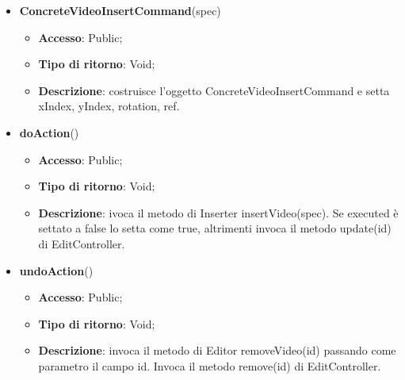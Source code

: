 {{{	
	\begin{itemize}
		\item \textbf{ConcreteVideoInsertCommand}(spec)
		\begin{itemize}
			\item \textbf{Accesso}: Public;
			\item \textbf{Tipo di ritorno}: Void;
			\item \textbf{Descrizione}: costruisce l’oggetto ConcreteVideoInsertCommand e setta xIndex, yIndex, rotation, ref.
		\end{itemize}
		\item \textbf{doAction}()
		\begin{itemize}
			\item \textbf{Accesso}: Public;
			\item \textbf{Tipo di ritorno}: Void;
			\item \textbf{Descrizione}: ivoca il metodo di Inserter insertVideo(spec). Se executed è settato a false lo setta come true, altrimenti invoca il metodo update(id) di EditController.
		\end{itemize}
		\item \textbf{undoAction}()
		\begin{itemize}
			\item \textbf{Accesso}: Public;
			\item \textbf{Tipo di ritorno}: Void;
			\item \textbf{Descrizione}: invoca il metodo di Editor removeVideo(id) passando come parametro il campo id. Invoca il metodo remove(id) di EditController.
		\end{itemize}
	\end{itemize}
	}
}}
